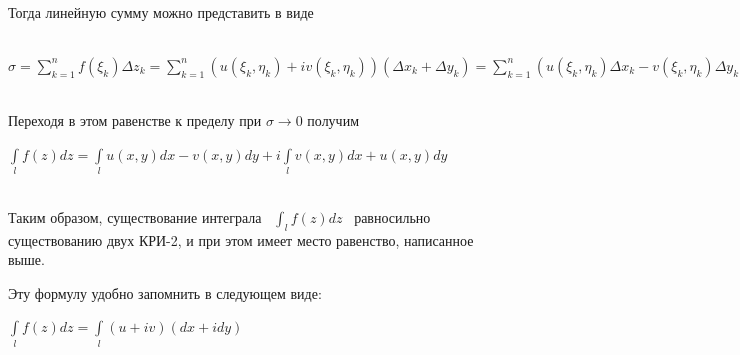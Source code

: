 \documentclass[a4paper, 12pt]{report}
\begin{document}
\par\bigskip
\\Тогда линейную сумму можно представить в виде  
\par\bigskip
\\ \( \sigma = \sum\limits_{k=1}^n  f( \xi_k )\Delta z_k = \sum\limits_{k=1}^n (u(\xi_k , \eta_k)+ iv(\xi_k , \eta_k))(\Delta x_k +  \Delta y_k )= \sum\limits_{k=1}^n (u(\xi_k , \eta_k) \Delta x_k- v(\xi_k , \eta_k)\Delta y_k) +i\sum\limits_{k=1}^n (u(\xi_k , \eta_k)\Delta y_k+v(\xi_k , \eta_k)\Delta x_k) \)
\par\bigskip
\\Переходя в этом равенстве к пределу при \( \sigma\to 0 \) получим
\par\bigskip \( \int\limits_l f(z)dz = \int\limits_l u(x,y)dx - v(x,y)dy + i \int\limits_l v(x,y)dx + u(x,y)dy\) 
\par\bigskip
\\Таким образом, существование интеграла \  \( \int_l f(z)dz\) \  равносильно существованию двух КРИ-2, и при этом имеет место равенство, написанное выше.
\par\bigskip Эту формулу удобно запомнить в следующем виде:
\begin{center}
    \( \int\limits_l f(z)dz = \int\limits_l (u+iv)(dx+idy)\)
\end{center}

\par\bigskip
\end{document}
